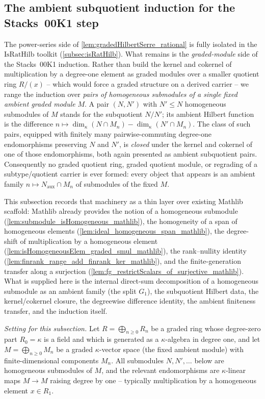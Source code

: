\subsection{The ambient subquotient induction for the Stacks~00K1 step}
\label{subsec:gradedModuleApi}

The power-series side of \cref{lem:gradedHilbertSerre_rational} is fully isolated
in the \(\mathrm{IsRatHilb}\) toolkit (\cref{subsec:isRatHilb}). What remains is
the \emph{graded-module} side of the Stacks~00K1 induction. Rather than build the
kernel and cokernel of multiplication by a degree-one element as graded modules
over a smaller quotient ring \(R/(x)\) -- which would force a graded structure on a
derived carrier -- we range the induction over \emph{pairs of homogeneous
submodules of a single fixed ambient graded module} \(M\). A pair \((N, N')\) with
\(N' \le N\) homogeneous submodules of \(M\) stands for the subquotient \(N/N'\); its
ambient Hilbert function is the difference \(n \mapsto \dim_\kappa(N \cap M_n) -
\dim_\kappa(N' \cap M_n)\). The class of such pairs, equipped with finitely many
pairwise-commuting degree-one endomorphisms preserving \(N\) and \(N'\), is
\emph{closed} under the kernel and cokernel of one of those endomorphisms, both
again presented as ambient subquotient pairs. Consequently no graded quotient ring,
graded quotient module, or regrading of a subtype/quotient carrier is ever formed:
every object that appears is an ambient family \(n \mapsto N_{\mathrm{aux}} \cap M_n\)
of submodules of the fixed \(M\).

This subsection records that machinery as a thin layer over existing Mathlib
scaffold: Mathlib already provides the notion of a homogeneous submodule
(\cref{lem:submodule_isHomogeneous_mathlib}), the homogeneity of a span of
homogeneous elements (\cref{lem:ideal_homogeneous_span_mathlib}), the degree-shift
of multiplication by a homogeneous element
(\cref{lem:isHomogeneousElem_graded_smul_mathlib}), the rank--nullity identity
(\cref{lem:finrank_range_add_finrank_ker_mathlib}), and the finite-generation
transfer along a surjection (\cref{lem:fg_restrictScalars_of_surjective_mathlib}).
What is supplied here is the internal direct-sum decomposition of a homogeneous
submodule as an ambient family (the split \(G_1\)), the subquotient Hilbert data,
the kernel/cokernel closure, the degreewise difference identity, the ambient
finiteness transfer, and the induction itself.

\emph{Setting for this subsection.} Let \(R = \bigoplus_{n \ge 0} R_n\) be a graded
ring whose degree-zero part \(R_0 = \kappa\) is a field and which is generated as a
\(\kappa\)-algebra in degree one, and let \(M = \bigoplus_{n \ge 0} M_n\) be a graded
\(\kappa\)-vector space (the fixed ambient module) with finite-dimensional
components \(M_n\). All submodules \(N, N', \dots\) below are homogeneous submodules
of \(M\), and the relevant endomorphisms are \(\kappa\)-linear maps \(M \to M\)
raising degree by one -- typically multiplication by a homogeneous element
\(x \in R_1\).

